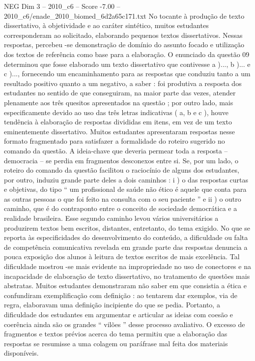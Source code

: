 \begin{textsample}{NEG Dim 3 – 2010\_c6 – Score -7.00 – 2010\_c6/enade\_2010\_biomed\_6d2a65c171.txt}
No tocante à produção de texto dissertativo, à objetividade e ao caráter sintético, muitos estudantes corresponderam ao solicitado, elaborando pequenos textos dissertativos.
Nessas respostas, percebeu -se demonstração de domínio do assunto focado e utilização dos textos de referência como base para a elaboração.
O enunciado da questão 09 determinou que fosse elaborado um texto dissertativo que contivesse a )..., b )... e c )..., fornecendo um encaminhamento para as respostas que conduziu tanto a um resultado positivo quanto a um negativo, a saber : foi produtiva a resposta dos estudantes no sentido de que conseguiram, na maior parte das vezes, atender plenamente aos três quesitos apresentados na questão ; por outro lado, mais especificamente devido ao uso das três letras indicativas ( a, b e c ), houve tendência à elaboração de respostas divididas em itens, em vez de um texto eminentemente dissertativo.
Muitos estudantes apresentaram respostas nesse formato fragmentado para satisfazer a formalidade do roteiro sugerido no comando da questão.
A ideia-chave que deveria permear toda a resposta – democracia – se perdia em fragmentos desconexos entre si.
Se, por um lado, o roteiro do comando da questão facilitou o raciocínio de alguns dos estudantes, por outro, induziu grande parte deles a dois caminhos : i ) o das respostas curtas e objetivas, do tipo “ um profissional de saúde não ético é aquele que conta para as outras pessoas o que foi feito na consulta com o seu paciente ” e ii ) o outro caminho, que é do contraponto entre o conceito de sociedade democrática e a realidade brasileira.
Esse segundo caminho levou vários universitários a produzirem textos bem escritos, distantes, entretanto, do tema exigido.
No que se reporta às especificidades do desenvolvimento do conteúdo, a dificuldade ou falta de competência comunicativa revelada em grande parte das respostas denuncia a pouca exposição dos alunos à leitura de textos escritos de mais excelência.
Tal dificuldade mostrou -se mais evidente na impropriedade no uso de conectores e na incapacidade de elaboração de texto dissertativo, no tratamento de questões mais abstratas.
Muitos estudantes demonstraram não saber em que consistia a ética e confundiram exemplificação com definição : ao tentarem dar exemplos, via de regra, elaboravam uma definição incipiente do que se pedia.
Portanto, a dificuldade dos estudantes em argumentar e articular as ideias com coesão e coerência ainda são os grandes “ vilões ” desse processo avaliativo.
O excesso de fragmentos e textos prévios acerca do tema permitiu que a elaboração das respostas se resumisse a uma colagem ou paráfrase mal feita dos materiais disponíveis.

\end{textsample}
